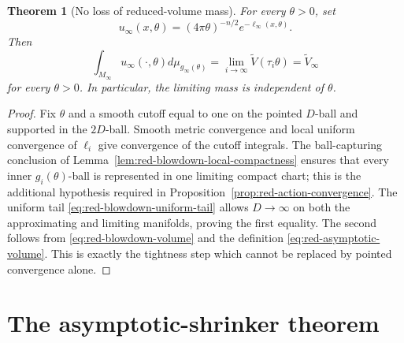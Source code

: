 \documentclass[10pt]{coll-l}
\newtheorem{theorem}{Theorem}[chapter]
\theoremstyle{definition}
\theoremstyle{remark}
\numberwithin{section}{chapter}
\numberwithin{equation}{chapter}
\begin{document}
\begin{theorem}[No loss of reduced-volume mass]
\label{thm:red-no-mass-loss}
For every $\theta>0$, set
\begin{equation}
 u_\infty(x,\theta)
       =(4\pi\theta)^{-n/2}e^{-\ell_\infty(x,\theta)}.   \label{eq:red-limit-density}
\end{equation}
Then
\begin{equation}
 \int_{M_\infty}u_\infty(\cdot,\theta)d\mu_{g_\infty(\theta)}
 =\lim_{i\to\infty}\widetilde V(\tau_i\theta)
 =\widetilde V_\infty                                  \label{eq:red-no-mass-loss}
\end{equation}
for every $\theta>0$.  In particular, the limiting mass is independent of
$\theta$.
\end{theorem}

\begin{proof}
Fix $\theta$ and a smooth cutoff equal to one on the pointed $D$-ball and
supported in the $2D$-ball.  Smooth metric convergence and local uniform
convergence of $\ell_i$ give convergence of the cutoff integrals.  The
ball-capturing conclusion of
Lemma~\ref{lem:red-blowdown-local-compactness} ensures that every inner
$g_i(\theta)$-ball is represented in one limiting compact chart; this is
the additional hypothesis required in
Proposition~\ref{prop:red-action-convergence}.  The
uniform tail \eqref{eq:red-blowdown-uniform-tail} allows $D\to\infty$ on both
the approximating and limiting manifolds, proving the first equality.  The
second follows from \eqref{eq:red-blowdown-volume} and the definition
\eqref{eq:red-asymptotic-volume}.  This is exactly the tightness step which
cannot be replaced by pointed convergence alone.
\end{proof}

\section{The asymptotic-shrinker theorem}
\label{sec:red-asymptotic-shrinker}
\end{document}
